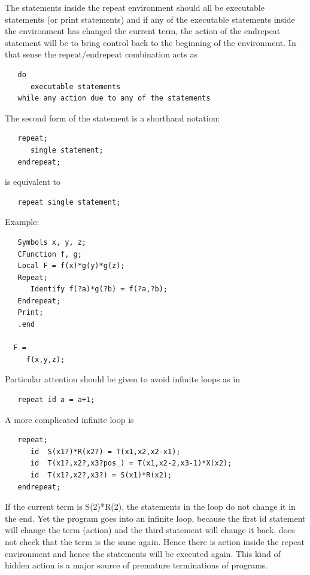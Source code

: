 \noindent The statements inside the repeat environment should all be 
executable statements (or print statements) and if any of the executable 
statements inside the environment has changed the current term, the action 
of the endrepeat statement will be to bring control back to the beginning 
of the environment. In that sense the repeat/endrepeat combination acts as
\begin{verbatim}
   do
      executable statements
   while any action due to any of the statements
\end{verbatim}
The second form of the statement is a shorthand notation:
\begin{verbatim}
   repeat;
      single statement;
   endrepeat;
\end{verbatim}
is equivalent to
\begin{verbatim}
   repeat single statement;
\end{verbatim}
\noindent Example:
\begin{verbatim}
   Symbols x, y, z;
   CFunction f, g;
   Local F = f(x)*g(y)*g(z);
   Repeat;
      Identify f(?a)*g(?b) = f(?a,?b);
   Endrepeat;
   Print;
   .end

  F =
     f(x,y,z);
\end{verbatim}
\vspace{4mm}
Particular attention should be given to avoid infinite 
loops as in
\begin{verbatim}
   repeat id a = a+1;
\end{verbatim}
A more complicated infinite loop is
\begin{verbatim}
   repeat;
      id  S(x1?)*R(x2?) = T(x1,x2,x2-x1);
      id  T(x1?,x2?,x3?pos_) = T(x1,x2-2,x3-1)*X(x2);
      id  T(x1?,x2?,x3?) = S(x1)*R(x2);
   endrepeat;
\end{verbatim}
If the current term is S(2)*R(2), the statements in the loop do not change 
it in the end. Yet the program goes into an infinite loop, because the 
first id statement will change the term (action) and the third statement 
will change it back. {\FORM} does not check that the term is the same 
again. Hence there is action inside the repeat environment and hence the 
statements will be executed again. This kind of hidden action is a major 
source of premature 
terminations of {\FORM} programs. \vspace{4mm}

